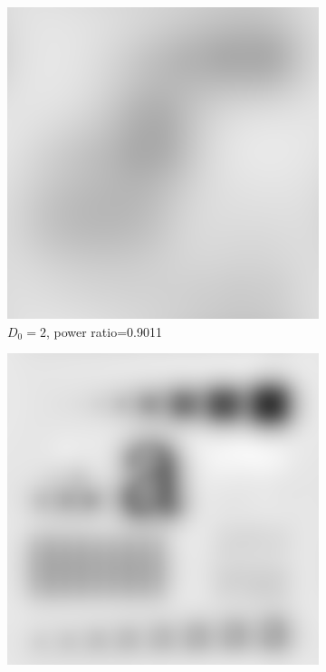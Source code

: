 \begin{figure}[h!]
	\centering
	\begin{subfigure}[b]{0.45\linewidth}
		\includegraphics[width=\linewidth]{myfigure/p3/BLPF_2.png}
		\caption{$D_0=2$, power ratio=0.9011}
		\label{fig:BLPF_2}
	\end{subfigure}
	\begin{subfigure}[b]{0.45\linewidth}
		\includegraphics[width=\linewidth]{myfigure/p3/BLPF_5.png}

\end{subfigure}
\end{figure}
